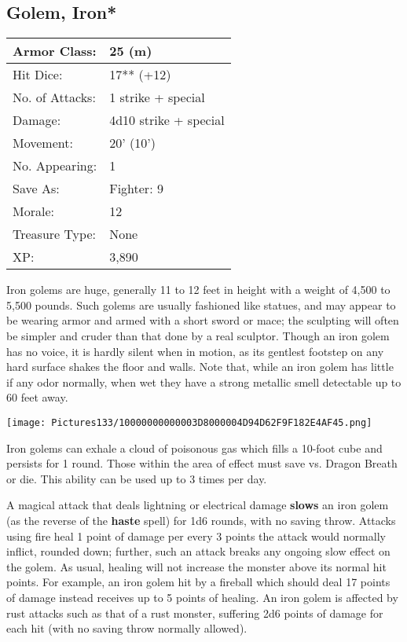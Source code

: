 \documentclass[a4paper,twoside,openany,10pt]{book}
\begin{document}
\begin{multicols}{2}
\subsection*{Golem, Iron*}\label{golem-iron}

\begin{tabularx}{0.48\textwidth}{@{}lX@{}}
Armor Class: & 25 (m) \\\hline
Hit Dice: & 17** (+12) \\\hline
No. of Attacks: & 1 strike + special \\\hline
Damage: & 4d10 strike + special \\\hline
Movement: & 20' (10') \\\hline
No. Appearing: & 1 \\\hline
Save As: & Fighter: 9 \\\hline
Morale: & 12 \\\hline
Treasure Type: & None \\\hline
XP: & 3,890 \\\hline
\end{tabularx}

Iron golems are huge, generally 11 to 12 feet in height with a weight of 4,500 to 5,500 pounds. Such golems are usually fashioned like statues, and may appear to be wearing armor and armed with a short sword or mace; the sculpting will often be simpler and cruder than that done by a real sculptor. Though an iron golem has no voice, it is hardly silent when in motion, as its gentlest footstep on any hard surface shakes the floor and walls. Note that, while an iron golem has little if any odor normally, when wet they have a strong metallic smell detectable up to 60 feet away.

\begin{center}
	\texttt{[image: Pictures133/10000000000003D8000004D94D62F9F182E4AF45.png]}
\end{center}

Iron golems can exhale a cloud of poisonous gas which fills a 10-foot cube and persists for 1 round. Those within the area of effect must save vs. Dragon Breath or die. This ability can be used up to 3 times per day.


A magical attack that deals lightning or electrical damage \textbf{slows} an iron golem (as the reverse of the \textbf{haste} spell) for 1d6 rounds, with no saving throw. Attacks using fire heal 1 point of damage per every 3 points the attack would normally inflict, rounded down; further, such an attack breaks any ongoing slow effect on the golem. As usual, healing will not increase the monster above its normal hit points. For example, an iron golem hit by a fireball which should deal 17 points of damage instead receives up to 5 points of healing. An iron golem is affected by rust attacks such as that of a rust monster, suffering 2d6 points of damage for each hit (with no saving throw normally allowed).


\end{multicols}
\end{document}
